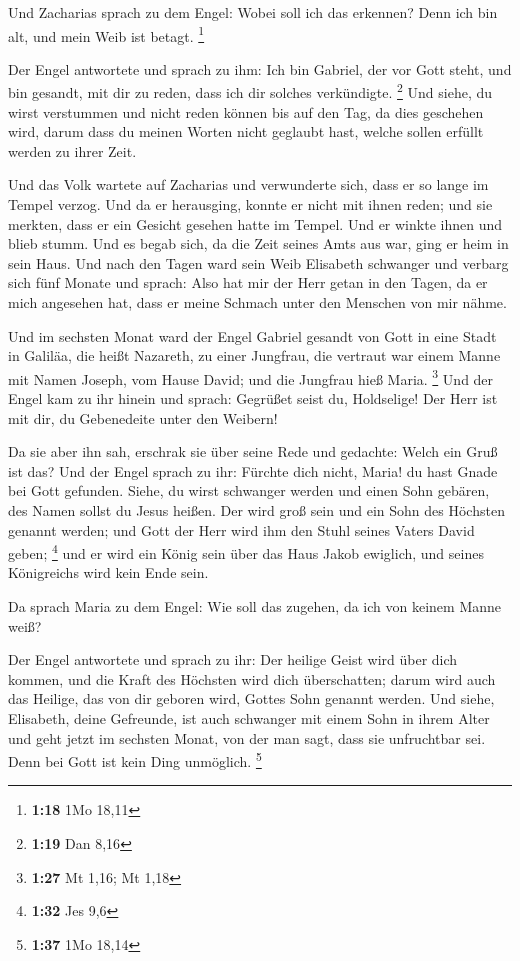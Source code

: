  Und Zacharias sprach zu dem Engel: Wobei soll ich das
erkennen? Denn ich bin alt, und mein Weib ist betagt. \footnote{\textbf{1:18}
  1Mo 18,11}

 Der Engel antwortete und sprach zu ihm: Ich bin Gabriel,
der vor Gott steht, und bin gesandt, mit dir zu reden, dass ich dir
solches verkündigte. \footnote{\textbf{1:19} Dan 8,16}  Und
siehe, du wirst verstummen und nicht reden können bis auf den Tag, da
dies geschehen wird, darum dass du meinen Worten nicht geglaubt hast,
welche sollen erfüllt werden zu ihrer Zeit.

 Und das Volk wartete auf Zacharias und verwunderte sich,
dass er so lange im Tempel verzog.  Und da er herausging,
konnte er nicht mit ihnen reden; und sie merkten, dass er ein Gesicht
gesehen hatte im Tempel. Und er winkte ihnen und blieb stumm.
 Und es begab sich, da die Zeit seines Amts aus war, ging
er heim in sein Haus.  Und nach den Tagen ward sein Weib
Elisabeth schwanger und verbarg sich fünf Monate und sprach:
 Also hat mir der Herr getan in den Tagen, da er mich
angesehen hat, dass er meine Schmach unter den Menschen von mir nähme.

 Und im sechsten Monat ward der Engel Gabriel gesandt von
Gott in eine Stadt in Galiläa, die heißt Nazareth,  zu
einer Jungfrau, die vertraut war einem Manne mit Namen Joseph, vom Hause
David; und die Jungfrau hieß Maria. \footnote{\textbf{1:27} Mt 1,16; Mt
  1,18}  Und der Engel kam zu ihr hinein und sprach:
Gegrüßet seist du, Holdselige! Der Herr ist mit dir, du Gebenedeite
unter den Weibern!

 Da sie aber ihn sah, erschrak sie über seine Rede und
gedachte: Welch ein Gruß ist das?  Und der Engel sprach zu
ihr: Fürchte dich nicht, Maria! du hast Gnade bei Gott gefunden.
 Siehe, du wirst schwanger werden und einen Sohn gebären,
des Namen sollst du Jesus heißen.  Der wird groß sein und
ein Sohn des Höchsten genannt werden; und Gott der Herr wird ihm den
Stuhl seines Vaters David geben; \footnote{\textbf{1:32} Jes 9,6}
 und er wird ein König sein über das Haus Jakob ewiglich,
und seines Königreichs wird kein Ende sein.

 Da sprach Maria zu dem Engel: Wie soll das zugehen, da ich
von keinem Manne weiß?

 Der Engel antwortete und sprach zu ihr: Der heilige Geist
wird über dich kommen, und die Kraft des Höchsten wird dich
überschatten; darum wird auch das Heilige, das von dir geboren wird,
Gottes Sohn genannt werden.  Und siehe, Elisabeth, deine
Gefreunde, ist auch schwanger mit einem Sohn in ihrem Alter und geht
jetzt im sechsten Monat, von der man sagt, dass sie unfruchtbar sei.
 Denn bei Gott ist kein Ding unmöglich. \footnote{\textbf{1:37}
  1Mo 18,14}


